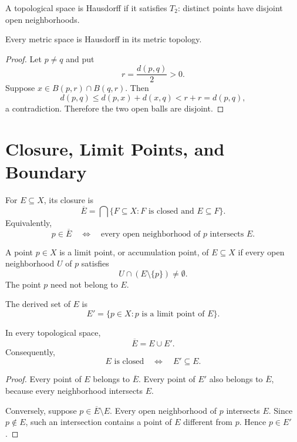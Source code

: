 \documentclass[answers,12pt,addpoints]{exam}
\begin{document}
\begin{definition}
A topological space is Hausdorff if it satisfies $T_2$:
distinct points have disjoint open neighborhoods.
\end{definition}

\begin{theorem}
Every metric space is Hausdorff in its metric topology.
\end{theorem}

\begin{proof}
Let $p\neq q$ and put
\[
r=\frac{d(p,q)}{2}>0.
\]
Suppose $x\in B(p,r)\cap B(q,r)$. Then
\[
d(p,q)
\leq d(p,x)+d(x,q)
<r+r
=d(p,q),
\]
a contradiction. Therefore the two open balls are disjoint.
\end{proof}

\section{Closure, Limit Points, and Boundary}

\begin{definition}[Closure]
For $E\subseteq X$, its closure is
\[
\overline{E}
=
\bigcap\{F\subseteq X:F\text{ is closed and }E\subseteq F\}.
\]
Equivalently,
\[
p\in\overline{E}
\quad\Longleftrightarrow\quad
\text{every open neighborhood of }p\text{ intersects }E.
\]
\end{definition}

\begin{definition}
A point $p\in X$ is a limit point, or accumulation point,
of $E\subseteq X$ if every open neighborhood $U$ of $p$
satisfies
\[
U\cap(E\setminus\{p\})\neq\emptyset.
\]
The point $p$ need not belong to $E$.
\end{definition}

\begin{definition}
The derived set of $E$ is
\[
E'=\{p\in X:p\text{ is a limit point of }E\}.
\]
\end{definition}

\begin{theorem}
In every topological space,
\[
\overline{E}=E\cup E'.
\]
Consequently,
\[
E\text{ is closed}
\quad\Longleftrightarrow\quad
E'\subseteq E.
\]
\end{theorem}

\begin{proof}
Every point of $E$ belongs to $\overline{E}$.
Every point of $E'$ also belongs to $\overline{E}$,
because every neighborhood intersects $E$.

Conversely, suppose $p\in\overline{E}\setminus E$.
Every open neighborhood of $p$ intersects $E$.
Since $p\notin E$, such an intersection contains a point
of $E$ different from $p$. Hence $p\in E'$.
\end{proof}
\end{document}
